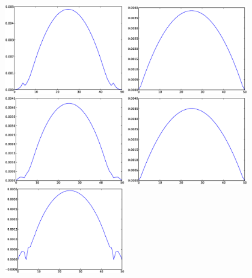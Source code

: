 \documentclass{article}
\begin{document}
  \begin{figure}
  \includegraphics[width=0.47\textwidth]{Figures/vel_bubble_force_width_6.eps}
  \hfill
  \includegraphics[width=0.47\textwidth]{Figures/vel_bulk_force_width_6.eps}\\
  \includegraphics[width=0.47\textwidth]{Figures/vel_bubble_force_width_10.eps}
  \hfill
  \includegraphics[width=0.47\textwidth]{Figures/vel_bulk_force_width_10.eps}\\
  \includegraphics[width=0.47\textwidth]{Figures/vel_bubble_force_width_14.eps}

\end{figure}
\end{document}
